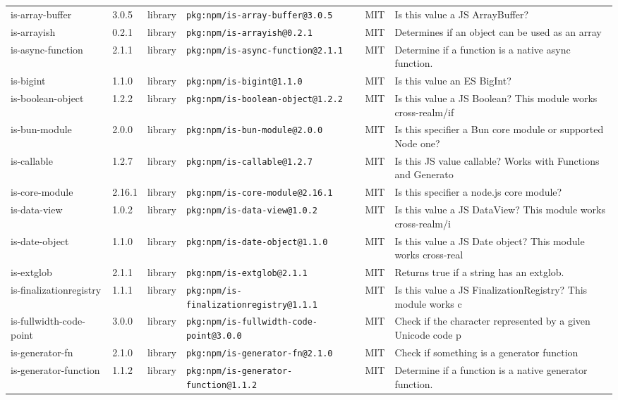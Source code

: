 \documentclass[11pt]{article}
\begin{document}
\begin{longtable}{|l|l|l|p{2.2cm}|l|p{4cm}|}
is-array-buffer & 3.0.5 & library & \texttt{pkg:npm/is-array-buffer@3.0.5} & MIT & Is this value a JS ArrayBuffer? \\
is-arrayish & 0.2.1 & library & \texttt{pkg:npm/is-arrayish@0.2.1} & MIT & Determines if an object can be used as an array \\
is-async-function & 2.1.1 & library & \texttt{pkg:npm/is-async-function@2.1.1} & MIT & Determine if a function is a native async function. \\
is-bigint & 1.1.0 & library & \texttt{pkg:npm/is-bigint@1.1.0} & MIT & Is this value an ES BigInt? \\
is-boolean-object & 1.2.2 & library & \texttt{pkg:npm/is-boolean-object@1.2.2} & MIT & Is this value a JS Boolean? This module works cross-realm/if \\
is-bun-module & 2.0.0 & library & \texttt{pkg:npm/is-bun-module@2.0.0} & MIT & Is this specifier a Bun core module or supported Node one? \\
is-callable & 1.2.7 & library & \texttt{pkg:npm/is-callable@1.2.7} & MIT & Is this JS value callable? Works with Functions and Generato \\
is-core-module & 2.16.1 & library & \texttt{pkg:npm/is-core-module@2.16.1} & MIT & Is this specifier a node.js core module? \\
is-data-view & 1.0.2 & library & \texttt{pkg:npm/is-data-view@1.0.2} & MIT & Is this value a JS DataView? This module works cross-realm/i \\
is-date-object & 1.1.0 & library & \texttt{pkg:npm/is-date-object@1.1.0} & MIT & Is this value a JS Date object? This module works cross-real \\
is-extglob & 2.1.1 & library & \texttt{pkg:npm/is-extglob@2.1.1} & MIT & Returns true if a string has an extglob. \\
is-finalizationregistry & 1.1.1 & library & \texttt{pkg:npm/is-finalizationregistry@1.1.1} & MIT & Is this value a JS FinalizationRegistry? This module works c \\
is-fullwidth-code-point & 3.0.0 & library & \texttt{pkg:npm/is-fullwidth-code-point@3.0.0} & MIT & Check if the character represented by a given Unicode code p \\
is-generator-fn & 2.1.0 & library & \texttt{pkg:npm/is-generator-fn@2.1.0} & MIT & Check if something is a generator function \\
is-generator-function & 1.1.2 & library & \texttt{pkg:npm/is-generator-function@1.1.2} & MIT & Determine if a function is a native generator function. \\

\end{longtable}
\end{document}
